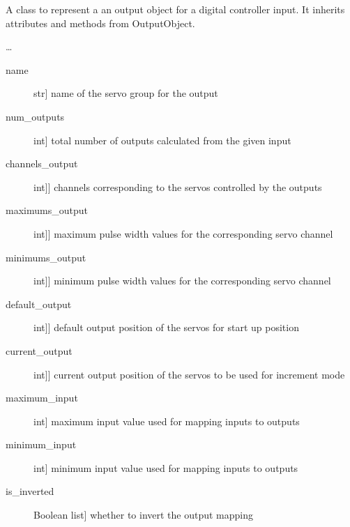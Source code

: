 \documentclass[letterpaper,10pt,english]{sphinxmanual}
\begin{document}
\begin{fulllineitems}
\label{\detokenize{generic:DigitalOutputObject.DigitalOutputObject}}
\sphinxAtStartPar
A class to represent a an output object for a digital controller input.
It inherits attributes and methods from OutputObject.

\sphinxAtStartPar
…
\begin{description}
\item[{name}] \leavevmode{[}str{]}
\sphinxAtStartPar
name of the servo group for the output

\item[{num\_outputs}] \leavevmode{[}int{]}
\sphinxAtStartPar
total number of outputs calculated from the given input

\item[{channels\_output}] \leavevmode{[}{[}int{]}{]}
\sphinxAtStartPar
channels corresponding to the servos controlled by the outputs

\item[{maximums\_output}] \leavevmode{[}{[}int{]}{]}
\sphinxAtStartPar
maximum pulse width values for the corresponding servo channel

\item[{minimums\_output}] \leavevmode{[}{[}int{]}{]}
\sphinxAtStartPar
minimum pulse width values for the corresponding servo channel

\item[{default\_output}] \leavevmode{[}{[}int{]}{]}
\sphinxAtStartPar
default output position of the servos for start up position

\item[{current\_output}] \leavevmode{[}{[}int{]}{]}
\sphinxAtStartPar
current output position of the servos to be used for increment mode

\item[{maximum\_input}] \leavevmode{[}int{]}
\sphinxAtStartPar
maximum input value used for mapping inputs to outputs

\item[{minimum\_input}] \leavevmode{[}int{]}
\sphinxAtStartPar
minimum input value used for mapping inputs to outputs

\item[{is\_inverted}] \leavevmode{[}Boolean list{]}
\sphinxAtStartPar
whether to invert the output mapping


\end{description}
\end{fulllineitems}
\end{document}
